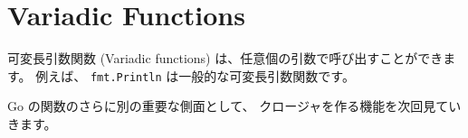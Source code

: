 \section{Variadic Functions}

可変長引数関数 (Variadic functions) は、任意個の引数で呼び出すことができます。 例えば、 \texttt{fmt.Println} は一般的な可変長引数関数です。




Go の関数のさらに別の重要な側面として、 クロージャを作る機能を次回見ていきます。